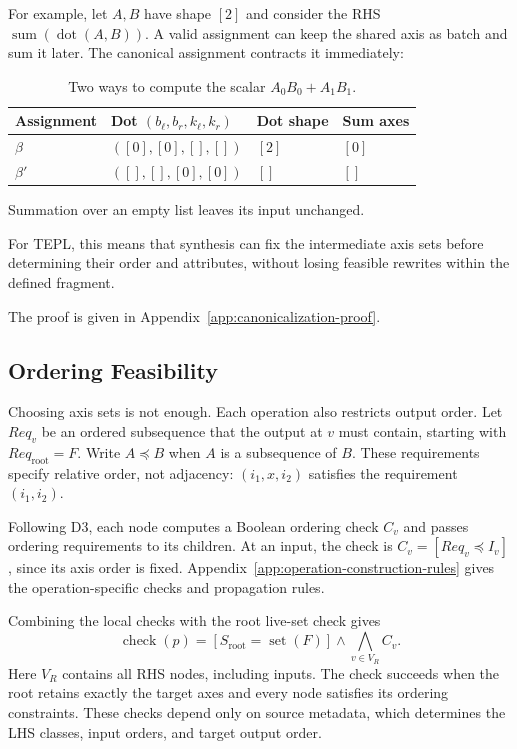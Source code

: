 For example, let $A,B$ have shape $[2]$ and consider the RHS
$\operatorname{sum}(\operatorname{dot}(A,B))$. A valid assignment can keep
the shared axis as batch and sum it later. The canonical assignment contracts
it immediately:
\begin{table}[!htbp]
\caption{Two ways to compute the scalar $A_0B_0+A_1B_1$.}
\label{tab:canonical-example}
\centering
\begin{tabular}{@{}llll@{}}\toprule
Assignment & Dot $(b_\ell,b_r,k_\ell,k_r)$ & Dot shape & Sum axes\\\midrule
$\beta$ & $([0],[0],[],[])$ & $[2]$ & $[0]$\\
$\beta'$ & $([],[],[0],[0])$ & $[]$ & $[]$\\\bottomrule
\end{tabular}
\end{table}
Summation over an empty list leaves its input unchanged.

For TEPL, this means that synthesis can fix the intermediate axis sets
before determining their order and attributes, without losing feasible
rewrites within the defined fragment.

The proof is given in Appendix~\ref{app:canonicalization-proof}.

\subsection{Ordering Feasibility}
\label{sec:ordering-feasibility}
Choosing axis sets is not enough. Each operation also restricts output
order. Let $Req_v$ be an ordered subsequence that the output at $v$ must
contain, starting with $Req_{\mathrm{root}}=F$. Write $A\preceq B$ when
$A$ is a subsequence of $B$. These requirements specify relative order,
not adjacency: $(i_1,x,i_2)$ satisfies the requirement $(i_1,i_2)$.

Following D3, each node computes a Boolean ordering check $C_v$ and passes
ordering requirements to its children. At an input, the check is
$C_v=[Req_v\preceq I_v]$, since its axis order is fixed.
Appendix~\ref{app:operation-construction-rules} gives the operation-specific checks and
propagation rules.

Combining the local checks with the root live-set check gives
\begin{equation}
 \operatorname{check}(p)
 =[S_{\mathrm{root}}=\operatorname{set}(F)]
 \land\bigwedge_{v\in V_R}C_v.
\label{eq:feasibility}
\end{equation}
Here $V_R$ contains all RHS nodes, including inputs. The check succeeds
when the root retains exactly the target axes and every node satisfies
its ordering constraints.
These checks depend only on source metadata, which determines the LHS
classes, input orders, and target output order.

